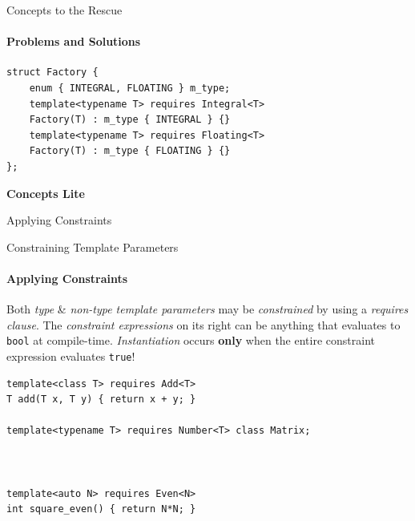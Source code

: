 \documentclass{beamer}
\begin{document}
    \begin{frame}[fragile]{Concepts to the Rescue}
        \framesubtitle{Problems and Solutions}
        \begin{center}
        \begin{lstlisting}[caption={overloading based on constraint with the \texttt{requires} clause.}]
struct Factory {
    enum { INTEGRAL, FLOATING } m_type;
    template<typename T> requires Integral<T>
    Factory(T) : m_type { INTEGRAL } {}
    template<typename T> requires Floating<T>
    Factory(T) : m_type { FLOATING } {}
}; \end{lstlisting}
        \end{center}
    \end{frame}

    \begin{frame}[fragile]{\textbf{Concepts Lite}}
    \end{frame}

    \begin{frame}[fragile]{Applying Constraints}
    \end{frame}

    \begin{frame}[fragile]{Constraining Template Parameters}
        \framesubtitle{Applying Constraints}
        Both \emph{type} \& \emph{non-type template parameters} may be \emph{constrained} by using a \emph{requires clause}. The \emph{constraint expressions} on its right can be anything that evaluates to \texttt{bool} at compile-time. \emph{Instantiation} occurs \textbf{only} when the entire constraint expression evaluates \texttt{true}!
        \vspace{-1em}
        \begin{center}
        \begin{lstlisting}[caption={constraining types \& values by using the \texttt{requires} clause.}]
template<class T> requires Add<T>
T add(T x, T y) { return x + y; }

template<typename T> requires Number<T> class Matrix;



template<auto N> requires Even<N>
int square_even() { return N*N; } \end{lstlisting}
        \end{center}
    \end{frame}
\end{document}
